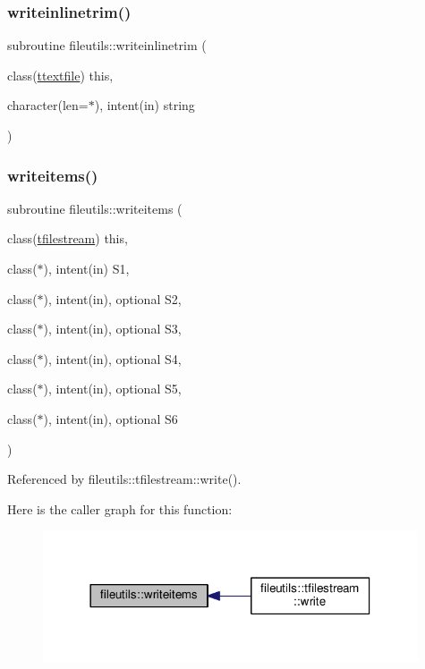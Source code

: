 \subsubsection{\texorpdfstring{writeinlinetrim()}{writeinlinetrim()}}
{\footnotesize\ttfamily subroutine fileutils\+::writeinlinetrim (\begin{DoxyParamCaption}\item[{class(\mbox{\hyperlink{structfileutils_1_1ttextfile}{ttextfile}})}]{this,  }\item[{character(len=$\ast$), intent(in)}]{string }\end{DoxyParamCaption})\hspace{0.3cm}{\ttfamily [private]}}

\mbox{\label{namespacefileutils_a0a2890041ec846715c0990fc468b6be1}} 
\subsubsection{\texorpdfstring{writeitems()}{writeitems()}}
{\footnotesize\ttfamily subroutine fileutils\+::writeitems (\begin{DoxyParamCaption}\item[{class(\mbox{\hyperlink{structfileutils_1_1tfilestream}{tfilestream}})}]{this,  }\item[{class($\ast$), intent(in)}]{S1,  }\item[{class($\ast$), intent(in), optional}]{S2,  }\item[{class($\ast$), intent(in), optional}]{S3,  }\item[{class($\ast$), intent(in), optional}]{S4,  }\item[{class($\ast$), intent(in), optional}]{S5,  }\item[{class($\ast$), intent(in), optional}]{S6 }\end{DoxyParamCaption})\hspace{0.3cm}{\ttfamily [private]}}



Referenced by fileutils\+::tfilestream\+::write().

Here is the caller graph for this function\+:
\nopagebreak
\begin{figure}[H]
\begin{center}
\leavevmode
\includegraphics[width=314pt]{namespacefileutils_a0a2890041ec846715c0990fc468b6be1_icgraph}
\end{center}
\end{figure}
\mbox{\label{namespacefileutils_a081a95c89cd56409865919dc2230a9f3}} 
